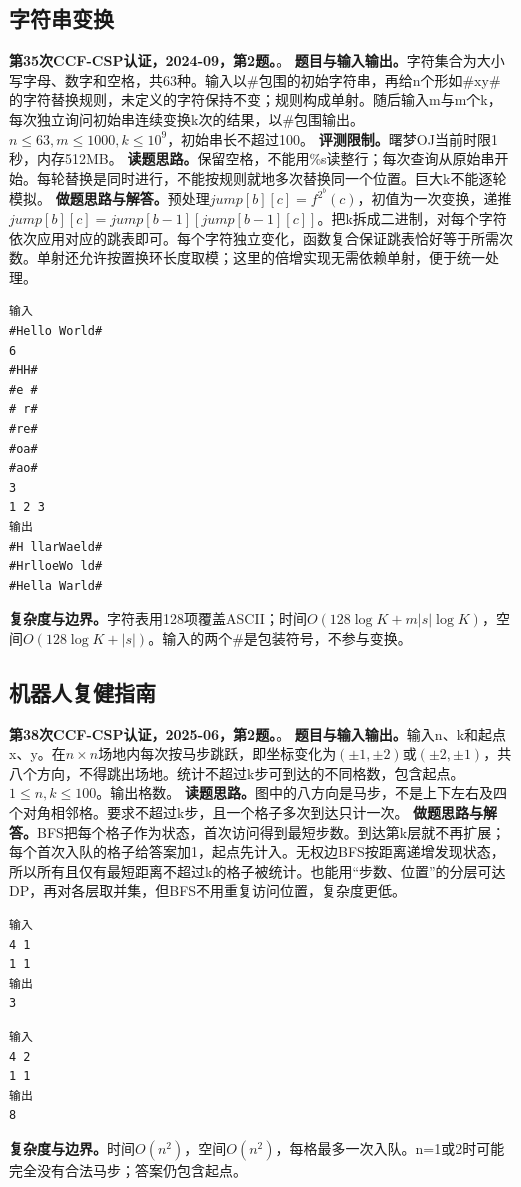 \subsection{字符串变换}
\textbf{第35次CCF-CSP认证，2024-09，第2题。}。
\textbf{题目与输入输出。}字符集合为大小写字母、数字和空格，共63种。输入以\#包围的初始字符串，再给n个形如\#xy\#的字符替换规则，未定义的字符保持不变；规则构成单射。随后输入m与m个k，每次独立询问初始串连续变换k次的结果，以\#包围输出。$n\le63,m\le1000,k\le10^9$，初始串长不超过100。
\textbf{评测限制。}曙梦OJ当前时限1秒，内存512MB。
\textbf{读题思路。}保留空格，不能用\%s读整行；每次查询从原始串开始。每轮替换是同时进行，不能按规则就地多次替换同一个位置。巨大k不能逐轮模拟。
\textbf{做题思路与解答。}预处理$jump[b][c]=f^{2^b}(c)$，初值为一次变换，递推$jump[b][c]=jump[b-1][jump[b-1][c]]$。把k拆成二进制，对每个字符依次应用对应的跳表即可。每个字符独立变化，函数复合保证跳表恰好等于所需次数。单射还允许按置换环长度取模；这里的倍增实现无需依赖单射，便于统一处理。
\begin{verbatim}
输入
#Hello World#
6
#HH#
#e #
# r#
#re#
#oa#
#ao#
3
1 2 3
输出
#H llarWaeld#
#HrlloeWo ld#
#Hella Warld#
\end{verbatim}
\textbf{复杂度与边界。}字符表用128项覆盖ASCII；时间$O(128\log K+m|s|\log K)$，空间$O(128\log K+|s|)$。输入的两个\#是包装符号，不参与变换。

\subsection{机器人复健指南}
\textbf{第38次CCF-CSP认证，2025-06，第2题。}。
\textbf{题目与输入输出。}输入n、k和起点x、y。在$n\times n$场地内每次按马步跳跃，即坐标变化为$(\pm1,\pm2)$或$(\pm2,\pm1)$，共八个方向，不得跳出场地。统计不超过k步可到达的不同格数，包含起点。$1\le n,k\le100$。输出格数。
\textbf{读题思路。}图中的八方向是马步，不是上下左右及四个对角相邻格。要求不超过k步，且一个格子多次到达只计一次。
\textbf{做题思路与解答。}BFS把每个格子作为状态，首次访问得到最短步数。到达第k层就不再扩展；每个首次入队的格子给答案加1，起点先计入。无权边BFS按距离递增发现状态，所以所有且仅有最短距离不超过k的格子被统计。也能用“步数、位置”的分层可达DP，再对各层取并集，但BFS不用重复访问位置，复杂度更低。
\begin{verbatim}
输入
4 1
1 1
输出
3
\end{verbatim}
\begin{verbatim}
输入
4 2
1 1
输出
8
\end{verbatim}
\textbf{复杂度与边界。}时间$O(n^2)$，空间$O(n^2)$，每格最多一次入队。n=1或2时可能完全没有合法马步；答案仍包含起点。

